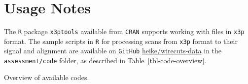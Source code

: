 \documentclass[fleqn,10pt]{wlscirep}
\begin{document}
\section*{Usage Notes}\label{sec-usage-notes}

The \texttt{R} package
\texttt{x3ptools}\citep{hofmannX3ptoolsToolsWorking2018} available from
\texttt{CRAN} supports working with files in \texttt{x3p} format. The
sample scripts in \texttt{R} for processing scans from \texttt{x3p}
format to their signal and alignment are available on \texttt{GitHub}
\href{https://github.com/heike/wirecuts-data}{heike/wirecuts-data} in
the \texttt{assessment/code} folder, as described in
Table~\ref{tbl-code-overview}.

\begin{table}

\caption{\label{tbl-code-overview}Overview of available codes.}

\centering{

}
\end{table}
\end{document}
